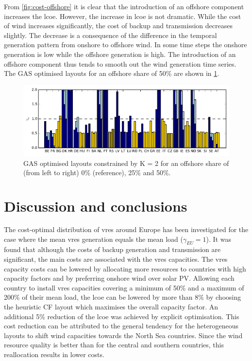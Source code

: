 \documentclass[a4paper, 5p, sort&compress]{elsarticle}%
\begin{document}
From \cref{fig:cost-offshore} it is clear that the introduction of an
offshore component increases the \gls{lcoe}. However, the increase in \gls{lcoe}
is not dramatic. While the cost of wind increases
significantly, the cost of backup and transmission decreases
slightly. The decrease is a consequence of the difference in the
temporal generation pattern from onshore to offshore wind. In some
time steps the onshore generation is low while the offshore generation
is high. The introduction of an offshore component thus tends to
smooth out the wind generation time series. %
The GAS optimised layouts for an offshore share of 50\% are shown in
\cref{fig:layout-offshore}.

\begin{figure}[t!]
  \centering
  \includegraphics[width = 2\columnwidth, center]{offshoreLayouts-new}
  \caption{GAS optimised layouts constrained by K = 2 for an offshore
    share of (from left to right) 0\% (reference), 25\% and 50\%.} %
  \label{fig:layout-offshore}
\end{figure}

\section{Discussion and conclusions}
\label{sec:four}

The cost-optimal distribution of \gls{vres} around Europe has been
investigated for the case where the mean \gls{vres} generation equals the
mean load ($\gamma_{EU} = 1$). It was found that although the costs of
backup generation and transmission are significant, the main costs are
associated with the \gls{vres} capacities. The \gls{vres} capacity costs can be
lowered by allocating more resources to countries with high capacity
factors and by preferring onshore wind over solar PV. Allowing each
country to install \gls{vres} capacities covering a minimum of 50\% and a
maximum of 200\% of their mean load, the \gls{lcoe} can be lowered by more
than 8\% by choosing the heuristic CF layout which maximises the
overall capacity factor. An additional 5\% reduction of the \gls{lcoe} was
achieved by explicit optimisation. This cost reduction can be
attributed to the general tendency for the heterogeneous layouts to
shift wind capacities towards the North Sea countries. Since the wind
resource quality is better than for the central and southern
countries, this reallocation results in lower costs.
\end{document}
